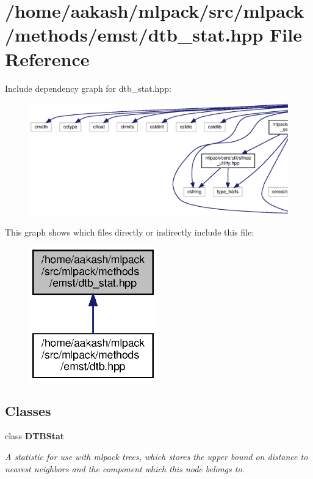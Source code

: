 \section{/home/aakash/mlpack/src/mlpack/methods/emst/dtb\+\_\+stat.hpp File Reference}
\label{dtb__stat_8hpp}
Include dependency graph for dtb\+\_\+stat.\+hpp\+:
\nopagebreak
\begin{figure}[H]
\begin{center}
\leavevmode
\includegraphics[width=350pt]{dtb__stat_8hpp__incl}
\end{center}
\end{figure}
This graph shows which files directly or indirectly include this file\+:
\nopagebreak
\begin{figure}[H]
\begin{center}
\leavevmode
\includegraphics[width=157pt]{dtb__stat_8hpp__dep__incl}
\end{center}
\end{figure}
\subsection*{Classes}
\begin{DoxyCompactItemize}
\item 
class \textbf{ D\+T\+B\+Stat}
\begin{DoxyCompactList}\small\item\em A statistic for use with mlpack trees, which stores the upper bound on distance to nearest neighbors and the component which this node belongs to. \end{DoxyCompactList}\end{DoxyCompactItemize}
